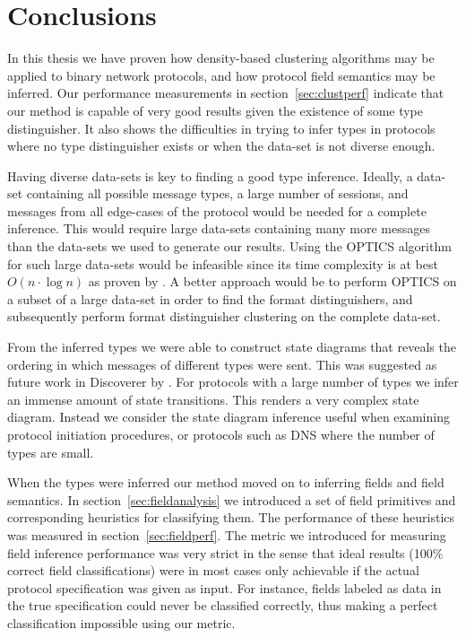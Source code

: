 \documentclass[a4paper]{report}
\begin{document}
\section{Conclusions}
In this thesis we have proven how density-based clustering algorithms may be
applied to binary network protocols, and how protocol field semantics may be
inferred. Our performance measurements in section~\ref{sec:clustperf} indicate
that our method is capable of very good results given the existence of some
type distinguisher. It also shows the difficulties in trying to infer types
in protocols where no type distinguisher exists or when the data-set is
not diverse enough.

Having diverse data-sets is key to finding a good type inference. Ideally, a
data-set containing all possible message types, a large number of sessions,
and messages from all edge-cases of the protocol would be needed for a
complete inference. This would require large data-sets containing many more
messages than the data-sets we used to generate our results. Using the OPTICS
algorithm for such large data-sets would be infeasible since its time
complexity is at best $O(n \cdot \log n)$ as proven by \citet{ankerst99}.
A better approach would be to perform OPTICS on a subset of a large data-set
in order to find the format distinguishers, and subsequently perform
format distinguisher clustering on the complete data-set.

From the inferred types we were able to construct state diagrams that reveals
the ordering in which messages of different types were sent. This was suggested
as future work in Discoverer by \citet{cui07}. For protocols with a large
number of types we infer an immense amount of state transitions. This renders
a very complex state diagram. Instead we consider the state diagram inference
useful when examining protocol initiation procedures, or protocols such as
DNS where the number of types are small.

When the types were inferred our method moved on to inferring fields and field
semantics. In section~\ref{sec:fieldanalysis} we introduced a set of
field primitives and corresponding heuristics for classifying them. The
performance of these heuristics was measured in section~\ref{sec:fieldperf}.
The metric we introduced for measuring field inference performance was very
strict in the sense that ideal results (100\% correct field classifications)
were in most cases only achievable if the actual protocol specification was
given as input. For instance, fields labeled as data in the true specification
could never be classified correctly, thus making a perfect classification
impossible using our metric. 
\end{document}
